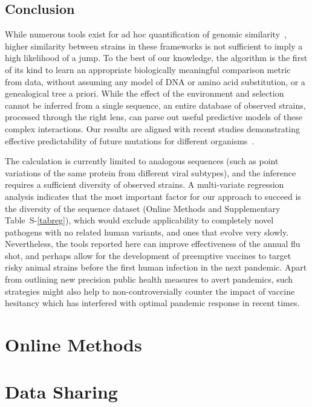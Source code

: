 \documentclass[onecolumn, compsoc,10pt]{IEEEtran}
\def\SUPPLEMENTARY{Supplementary\xspace}
\def\METHODS{Online Methods\xspace}
\begin{document}
\subsection*{Conclusion}
While numerous tools exist for ad hoc quantification of genomic similarity~\cite{posada1998modeltest,goldberger2005genomic,huelsenbeck1997phylogeny,neher2014predicting,VanderMeer2010,Smith2009}, higher similarity between strains in  these frameworks is not sufficient to imply a high likelihood of a jump. To the best of our knowledge, the \enet algorithm is  the first of its kind to learn an appropriate biologically meaningful comparison metric from data, without assuming any model of DNA or amino acid substitution, or a genealogical tree a priori. While the effect of the environment and selection cannot be inferred from a single sequence, an entire database of observed strains, processed through the right lens, can parse out useful predictive models of these complex interactions. Our results are  aligned with recent studies demonstrating effective  predictability of  future mutations  for different organisms~\cite{mollentze2021identifying,maher2021predicting}.

The \qdist calculation is currently limited to analogous sequences (such as point variations of the same protein from different viral subtypes), and the \enet inference requires a  sufficient diversity of observed strains. A multi-variate regression analysis indicates  that the most important factor for our approach to succeed is  the diversity of the sequence dataset (\METHODS and \SUPPLEMENTARY  Table~S-\ref{tabreg}), which would exclude applicability to completely novel pathogens with no related human variants, and ones that evolve very slowly. Nevertheless, the tools reported here can improve effectiveness of the annual flu shot, and perhaps allow for the development of preemptive vaccines to  target risky animal strains  before the first human infection in the next pandemic.
Apart from outlining new precision public health measures to avert pandemics, such strategies might also help to non-controversially counter the impact of vaccine hesitancy which has interfered with optimal pandemic response in recent times.

\section*{\METHODS}



\section*{Data Sharing} 
\end{document}
